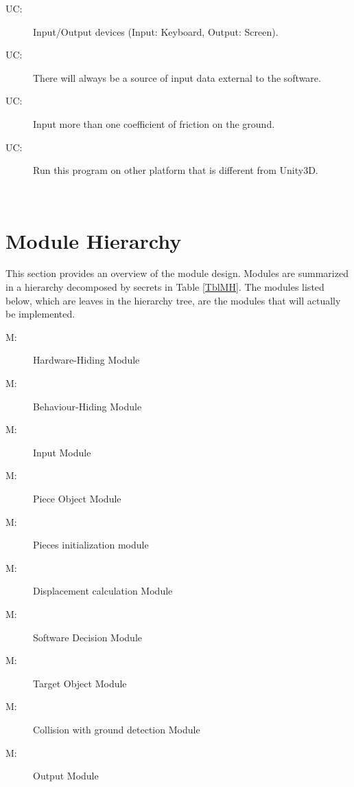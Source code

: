 \documentclass[12pt, titlepage]{article}
\newcounter{ucnum}
\newcommand{\uctheucnum}{UC\theucnum}
\newcounter{mnum}
\newcommand{\mthemnum}{M\themnum}
\begin{document}
	\begin{description}
		\item[ \uctheucnum \label{ucIO}:] Input/Output devices
		(Input: Keyboard, Output: Screen).
		\item[ \uctheucnum \label{ucInput}:] There will always be
		a source of input data external to the software.
		\item[ \uctheucnum \label{ucFri}:] Input more than one coefficient of friction on the ground.
		\item[ \uctheucnum \label{ucU}:] Run this program on other platform that is different from Unity3D.
	\end{description}
	
	\\
	\section{Module Hierarchy} \label{SecMH}
	
	This section provides an overview of the module design. Modules are summarized
	in a hierarchy decomposed by secrets in Table \ref{TblMH}. The modules listed
	below, which are leaves in the hierarchy tree, are the modules that will
	actually be implemented.
	
	\begin{description}
		\item [ \mthemnum \label{mHH}:] Hardware-Hiding Module
		\item [ \mthemnum \label{mBH}:] Behaviour-Hiding Module
		\item [ \mthemnum \label{mIF}:] Input Module
		\item [ \mthemnum \label{mPO}:] Piece Object Module
		\item [ \mthemnum \label{mOGC}:] Pieces initialization module
		\item [ \mthemnum \label{mDC1}:] Displacement calculation Module
		\item [ \mthemnum \label{mSD}:] Software Decision Module
		\item [ \mthemnum \label{mTO}:] Target Object Module
		\item [ \mthemnum \label{mOC}:] Collision with ground detection Module
		\item [ \mthemnum \label{mOM}:] Output Module
	\end{description}
	
\end{document}
